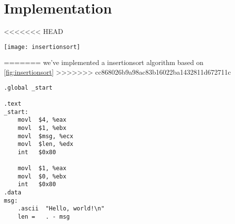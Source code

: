 \section{Implementation}

<<<<<<< HEAD

\texttt{[image: insertionsort]}\par\vspace{0.5cm} %



=======
we've implemented a insertionsort algorithm based on \ref{fig:insertionsort}
>>>>>>> cc868026b9a98ac83b16022ba1432811d672711c
\begin{lstlisting}
.global _start

.text
_start:
    movl  $4, %eax
    movl  $1, %ebx
    movl  $msg, %ecx
    movl  $len, %edx
    int   $0x80

    movl  $1, %eax
    movl  $0, %ebx
    int   $0x80
.data
msg:
    .ascii  "Hello, world!\n"
    len =   . - msg
\end{lstlisting}
